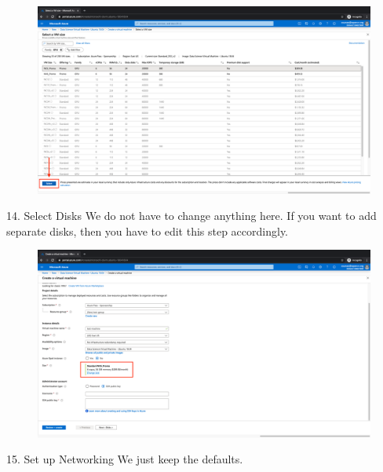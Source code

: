 \begin{figure}[H]
\begin{center} 
\includegraphics[scale=0.20]{figures/vm14}
\end{center}
\end{figure}

14. Select Disks
We do not have to change anything here. If you want to add separate disks, then you have to edit this step accordingly.

\begin{figure}[H]
\begin{center} 
\includegraphics[scale=0.20]{figures/vm15}
\end{center}
\end{figure}

15. Set up Networking
We just keep the defaults.

